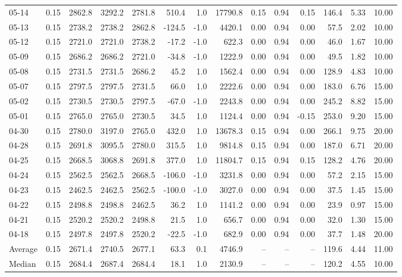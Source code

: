 \begin{threeparttable}
{\begin{tabular}{lrrrrrrrrrrrrr}
05-14 & 0.15 & 2862.8 & 3292.2 & 2781.8 & 510.4 & 1.0 & 17790.8 & 0.15 & 0.94 & 0.15 & 146.4 & 5.33 & 10.00 \\
05-13 & 0.15 & 2738.2 & 2738.2 & 2862.8 & -124.5 & -1.0 & 4420.1 & 0.00 & 0.94 & 0.00 & 57.5 & 2.02 & 10.00 \\
05-12 & 0.15 & 2721.0 & 2721.0 & 2738.2 & -17.2 & -1.0 & 622.3 & 0.00 & 0.94 & 0.00 & 46.0 & 1.67 & 10.00 \\
05-09 & 0.15 & 2686.2 & 2686.2 & 2721.0 & -34.8 & -1.0 & 1222.9 & 0.00 & 0.94 & 0.00 & 49.5 & 1.82 & 10.00 \\
05-08 & 0.15 & 2731.5 & 2731.5 & 2686.2 & 45.2 & 1.0 & 1562.4 & 0.00 & 0.94 & 0.00 & 128.9 & 4.83 & 10.00 \\
05-07 & 0.15 & 2797.5 & 2797.5 & 2731.5 & 66.0 & 1.0 & 2222.6 & 0.00 & 0.94 & 0.00 & 183.0 & 6.76 & 15.00 \\
05-02 & 0.15 & 2730.5 & 2730.5 & 2797.5 & -67.0 & -1.0 & 2243.8 & 0.00 & 0.94 & 0.00 & 245.2 & 8.82 & 15.00 \\
05-01 & 0.15 & 2765.0 & 2765.0 & 2730.5 & 34.5 & 1.0 & 1124.4 & 0.00 & 0.94 & -0.15 & 253.0 & 9.20 & 15.00 \\
04-30 & 0.15 & 2780.0 & 3197.0 & 2765.0 & 432.0 & 1.0 & 13678.3 & 0.15 & 0.94 & 0.00 & 266.1 & 9.75 & 20.00 \\
04-28 & 0.15 & 2691.8 & 3095.5 & 2780.0 & 315.5 & 1.0 & 9814.8 & 0.15 & 0.94 & 0.00 & 187.0 & 6.71 & 20.00 \\
04-25 & 0.15 & 2668.5 & 3068.8 & 2691.8 & 377.0 & 1.0 & 11804.7 & 0.15 & 0.94 & 0.15 & 128.2 & 4.76 & 20.00 \\
04-24 & 0.15 & 2562.5 & 2562.5 & 2668.5 & -106.0 & -1.0 & 3231.8 & 0.00 & 0.94 & 0.00 & 57.2 & 2.15 & 15.00 \\
04-23 & 0.15 & 2462.5 & 2462.5 & 2562.5 & -100.0 & -1.0 & 3027.0 & 0.00 & 0.94 & 0.00 & 37.5 & 1.45 & 15.00 \\
04-22 & 0.15 & 2498.8 & 2498.8 & 2462.5 & 36.2 & 1.0 & 1141.2 & 0.00 & 0.94 & 0.00 & 23.9 & 0.97 & 15.00 \\
04-21 & 0.15 & 2520.2 & 2520.2 & 2498.8 & 21.5 & 1.0 & 656.7 & 0.00 & 0.94 & 0.00 & 32.0 & 1.30 & 15.00 \\
04-18 & 0.15 & 2497.8 & 2497.8 & 2520.2 & -22.5 & -1.0 & 682.9 & 0.00 & 0.94 & 0.00 & 37.7 & 1.48 & 20.00 \\
Average & 0.15 & 2671.4 & 2740.5 & 2677.1 & 63.3 & 0.1 & 4746.9 & -- & -- & -- & 119.6 & 4.44 & 11.00 \\
Median & 0.15 & 2684.4 & 2687.4 & 2684.4 & 18.1 & 1.0 & 2130.9 & -- & -- & -- & 120.2 & 4.55 & 10.00 \\

\end{tabular}}
\end{threeparttable}
